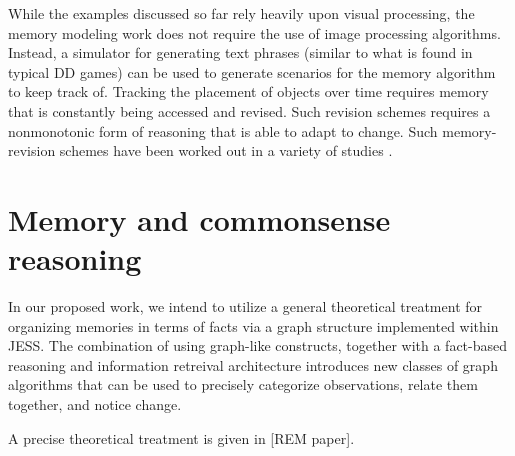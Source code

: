 \documentclass[12pt]{amsart}
\begin{document}
While the examples discussed so far rely heavily upon visual processing,
the memory modeling work does not require the use of image processing
algorithms.  Instead, a simulator for generating text phrases (similar to
what is found in typical DD games) can be used to generate scenarios for
the memory algorithm to keep track of.  Tracking the placement of objects
over time requires memory that is constantly being accessed and revised. 
Such revision schemes requires a nonmonotonic form of reasoning that is
able to adapt to change.  Such memory-revision schemes have been worked
out in a variety of studies
\cite{mccarthy/80:circum_a_form,chapman/93:every_reason_revis,elgot-drapkin/miller/perlis:mrt}.

\section{Memory and commonsense reasoning} 

 
In our proposed work, we intend to utilize a general theoretical
treatment for organizing memories in terms of facts via a graph structure
implemented within JESS.  The combination of using graph-like constructs,
together with a fact-based reasoning and information retreival
architecture introduces new classes of graph algorithms that can be used
to precisely categorize observations, relate them together, and notice
change. 
 
A precise theoretical treatment is given in [REM paper].
 
\end{document}
